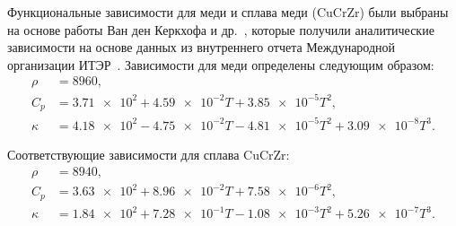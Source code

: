 Функциональные зависимости для меди и сплава меди (CuCrZr) были выбраны на основе работы Ван ден Керкхофа и др.~\cite{VandenKerkhof2021}, которые получили аналитические зависимости на основе данных из внутреннего отчета Международной организации ИТЭР~\cite{komarov2013thermal}. Зависимости для меди определены следующим образом:
\begin{subequations}
    \label{eq:app/Cu_props}
    \begin{align}
        \rho   & =  \num{8960},                                                             \\
        C_p    & =  \num{3.71e2} + \num{4.59e-2} T + \num{3.85e-5} T^2 ,                    \\
        \kappa & =  \num{4.18e2} - \num{4.75e-2} T - \num{4.81e-5} T^2 + \num{3.09e-8} T^3.
    \end{align}
\end{subequations}

Соответствующие зависимости для сплава CuCrZr:
\begin{subequations}
    \label{eq:app/CuCrZr_props}
    \begin{align}
        \rho   & =  \num{8940},                                                             \\
        C_p    & =  \num{3.63e2} + \num{8.96e-2} T + \num{7.58e-6} T^2 ,                    \\
        \kappa & = \num{1.84e2} + \num{7.28e-1} T - \num{1.08e-3} T^2 +  \num{5.26e-7} T^3.
    \end{align}
\end{subequations}

